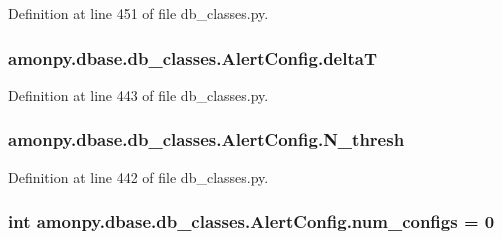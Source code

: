 Definition at line 451 of file db\-\_\-classes.\-py.

\hypertarget{classamonpy_1_1dbase_1_1db__classes_1_1_alert_config_ae6ec661f2f82ef7d84f6285a6feacaa9}{
\subsubsection[{delta\-T}]{\setlength{\rightskip}{0pt plus 5cm}amonpy.\-dbase.\-db\-\_\-classes.\-Alert\-Config.\-delta\-T}}\label{classamonpy_1_1dbase_1_1db__classes_1_1_alert_config_ae6ec661f2f82ef7d84f6285a6feacaa9}


Definition at line 443 of file db\-\_\-classes.\-py.

\hypertarget{classamonpy_1_1dbase_1_1db__classes_1_1_alert_config_aec4a19cdc1a4fa7269378278fe36bce3}{
\subsubsection[{N\-\_\-thresh}]{\setlength{\rightskip}{0pt plus 5cm}amonpy.\-dbase.\-db\-\_\-classes.\-Alert\-Config.\-N\-\_\-thresh}}\label{classamonpy_1_1dbase_1_1db__classes_1_1_alert_config_aec4a19cdc1a4fa7269378278fe36bce3}


Definition at line 442 of file db\-\_\-classes.\-py.

\hypertarget{classamonpy_1_1dbase_1_1db__classes_1_1_alert_config_ad02d71bf530446fdd3e8e87fb82bafb8}{
\subsubsection[{num\-\_\-configs}]{\setlength{\rightskip}{0pt plus 5cm}int amonpy.\-dbase.\-db\-\_\-classes.\-Alert\-Config.\-num\-\_\-configs = 0\hspace{0.3cm}{\ttfamily [static]}}}\label{classamonpy_1_1dbase_1_1db__classes_1_1_alert_config_ad02d71bf530446fdd3e8e87fb82bafb8}


